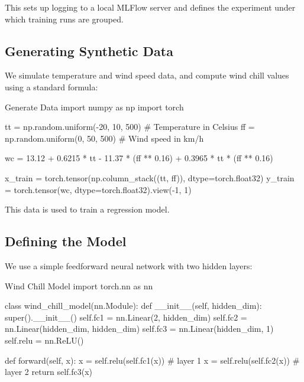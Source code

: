 This sets up logging to a local MLFlow server and defines the experiment under which training runs are grouped.

%
\subsection{Generating Synthetic Data}

We simulate temperature and wind speed data, and compute wind chill values using a standard formula:

\begin{codeonly}{Generate Data}
import numpy as np
import torch

tt = np.random.uniform(-20, 10, 500)   # Temperature in Celsius
ff = np.random.uniform(0, 50, 500)     # Wind speed in km/h

wc = 13.12 + 0.6215 * tt - 11.37 * (ff ** 0.16) + 0.3965 * tt * (ff ** 0.16)

x_train = torch.tensor(np.column_stack((tt, ff)), dtype=torch.float32)
y_train = torch.tensor(wc, dtype=torch.float32).view(-1, 1)
\end{codeonly}

This data is used to train a regression model.

%
\subsection{Defining the Model}

We use a simple feedforward neural network with two hidden layers:

\begin{codeonly}{Wind Chill Model}
import torch.nn as nn

class wind_chill_model(nn.Module):
    def __init__(self, hidden_dim):
        super().__init__()
        self.fc1 = nn.Linear(2, hidden_dim)
        self.fc2 = nn.Linear(hidden_dim, hidden_dim)
        self.fc3 = nn.Linear(hidden_dim, 1)
        self.relu = nn.ReLU()

    def forward(self, x):
        x = self.relu(self.fc1(x))  # layer 1
        x = self.relu(self.fc2(x))  # layer 2
        return self.fc3(x)
\end{codeonly}

